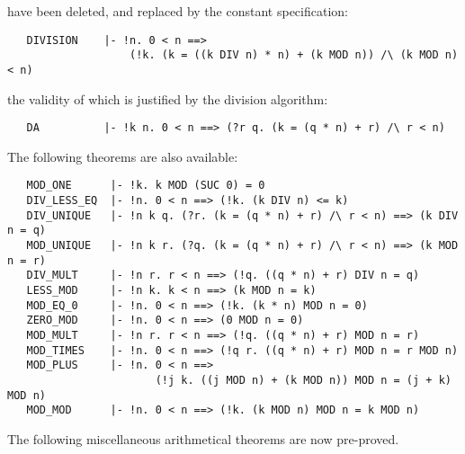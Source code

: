 \noindent have been deleted, and replaced by the constant specification:

\begin{hol}\begin{verbatim}
   DIVISION    |- !n. 0 < n ==> 
                   (!k. (k = ((k DIV n) * n) + (k MOD n)) /\ (k MOD n) < n)
\end{verbatim}\end{hol}

\noindent the validity of which is justified by the division algorithm:

\begin{hol}\begin{verbatim}
   DA          |- !k n. 0 < n ==> (?r q. (k = (q * n) + r) /\ r < n)
\end{verbatim}\end{hol}

The following theorems are also available:

\begin{hol}\begin{verbatim}
   MOD_ONE      |- !k. k MOD (SUC 0) = 0
   DIV_LESS_EQ  |- !n. 0 < n ==> (!k. (k DIV n) <= k)
   DIV_UNIQUE   |- !n k q. (?r. (k = (q * n) + r) /\ r < n) ==> (k DIV n = q)
   MOD_UNIQUE   |- !n k r. (?q. (k = (q * n) + r) /\ r < n) ==> (k MOD n = r)
   DIV_MULT     |- !n r. r < n ==> (!q. ((q * n) + r) DIV n = q)
   LESS_MOD     |- !n k. k < n ==> (k MOD n = k)
   MOD_EQ_0     |- !n. 0 < n ==> (!k. (k * n) MOD n = 0)
   ZERO_MOD     |- !n. 0 < n ==> (0 MOD n = 0)
   MOD_MULT     |- !n r. r < n ==> (!q. ((q * n) + r) MOD n = r)
   MOD_TIMES    |- !n. 0 < n ==> (!q r. ((q * n) + r) MOD n = r MOD n)
   MOD_PLUS     |- !n. 0 < n ==> 
                       (!j k. ((j MOD n) + (k MOD n)) MOD n = (j + k) MOD n)
   MOD_MOD      |- !n. 0 < n ==> (!k. (k MOD n) MOD n = k MOD n)
\end{verbatim}\end{hol}
 
 
  
The following miscellaneous arithmetical theorems
are now pre-proved.

